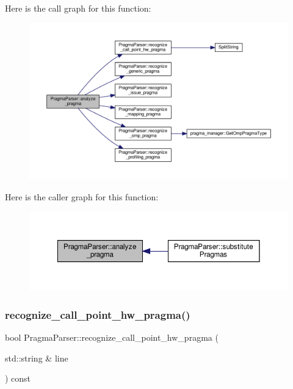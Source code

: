 Here is the call graph for this function\+:
\nopagebreak
\begin{figure}[H]
\begin{center}
\leavevmode
\includegraphics[width=350pt]{d6/d6c/classPragmaParser_ab8df876c3d71e8de2ff0b60a00d68c3b_cgraph}
\end{center}
\end{figure}
Here is the caller graph for this function\+:
\nopagebreak
\begin{figure}[H]
\begin{center}
\leavevmode
\includegraphics[width=350pt]{d6/d6c/classPragmaParser_ab8df876c3d71e8de2ff0b60a00d68c3b_icgraph}
\end{center}
\end{figure}
\mbox{\label{classPragmaParser_a74e5f7f8d176b4b1b1d86a06a629d360}} 
\subsubsection{\texorpdfstring{recognize\+\_\+call\+\_\+point\+\_\+hw\+\_\+pragma()}{recognize\_call\_point\_hw\_pragma()}}
{\footnotesize\ttfamily bool Pragma\+Parser\+::recognize\+\_\+call\+\_\+point\+\_\+hw\+\_\+pragma (\begin{DoxyParamCaption}\item[{std\+::string \&}]{line }\end{DoxyParamCaption}) const\hspace{0.3cm}{\ttfamily [private]}}



